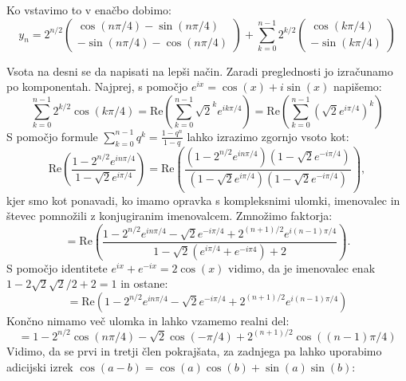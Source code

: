 \documentclass{article}
\begin{document}
Ko vstavimo to v enačbo dobimo:
\begin{equation*}
y_n = 
2^{n/2}
\begin{pmatrix}
\cos(n \pi/4) - \sin(n\pi/4) \\
-\sin(n \pi /4) - \cos(n \pi / 4)
\end{pmatrix} + \sum_{k=0}^{n-1}
2^{k/2}
\begin{pmatrix}
\cos(k \pi/4) \\
-\sin(k \pi /4)
\end{pmatrix} 
\end{equation*}

Vsota na desni se da napisati na lepši način. Zaradi preglednosti jo izračunamo po komponentah. Najprej, s pomočjo $e^{ix} = \cos(x) + i \sin(x)$ napišemo:
\begin{equation*}
\sum_{k=0}^{n-1} 2^{k/2} \cos(k \pi /4) = \mathrm{Re} \left( \sum_{k=0}^{n-1} \sqrt{2}^k e^{i k \pi/4} \right) = \mathrm{Re} \left( \sum_{k=0}^{n-1} (\sqrt{2} e^{i \pi/4})^k \right)
\end{equation*}
S pomočjo formule $\sum_{k=0}^{n-1} q^k = \frac{1-q^n}{1-q}$ lahko izrazimo zgornjo vsoto kot:
\begin{equation*}
\mathrm{Re} \left( \frac{1-2^{n/2} e^{i n \pi/ 4}}{1-\sqrt{2} e^{i \pi /4}} \right) = \mathrm{Re} \left( \frac{(1-2^{n/2} e^{i n \pi /4})(1-\sqrt{2} e^{-i\pi /4})}{(1-\sqrt{2} e^{i \pi /4})(1 - \sqrt{2} e^{-i \pi/ 4})} \right),
\end{equation*}
kjer smo kot ponavadi, ko imamo opravka s kompleksnimi ulomki, imenovalec in števec pomnožili z konjugiranim imenovalcem.
Zmnožimo faktorja:
\begin{equation*}
= \mathrm{Re} \left( \frac{1-2^{n/2} e^{i n \pi /4} - \sqrt{2} e^{-i \pi /4} + 2^{(n+1)/2} e^{i(n-1) \pi/ 4}}{1-\sqrt{2}(e^{i \pi /4} + e^{-i \pi 4}) + 2} \right).
\end{equation*}
S pomočjo identitete $e^{ix}+e^{-ix} = 2 \cos(x)$ vidimo, da je imenovalec enak $1-2\sqrt{2} \sqrt{2}/2 +2 = 1$ in ostane:
\begin{equation*}
= \mathrm{Re} \left( 1-2^{n/2} e^{i n \pi /4} - \sqrt{2} e^{-i \pi /4} + 2^{(n+1)/2} e^{i(n-1) \pi/ 4} \right)
\end{equation*}
Končno nimamo več ulomka in lahko vzamemo realni del:
\begin{equation*}
= 1-2^{n/2} \cos(n \pi / 4) - \sqrt{2} \cos(-\pi/4) + 2^{(n+1)/2}\cos((n-1) \pi/ 4)
\end{equation*}
Vidimo, da se prvi in tretji člen pokrajšata, za zadnjega pa lahko uporabimo adicijski izrek $\cos(a-b) = \cos(a)\cos(b) + \sin(a)\sin(b)$:
\end{document}
